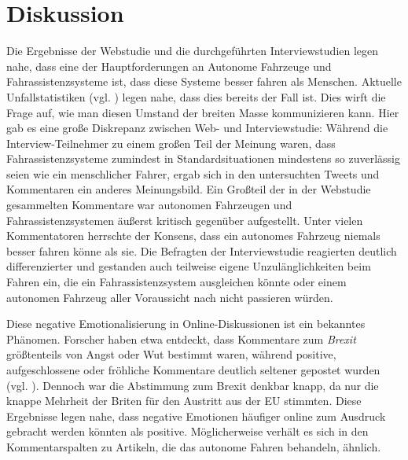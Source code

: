 \section{Diskussion}

Die Ergebnisse der Webstudie und die durchgeführten Interviewstudien legen nahe, dass eine der Hauptforderungen an Autonome Fahrzeuge und Fahrassistenzsysteme ist, dass diese Systeme besser fahren als Menschen. Aktuelle Unfallstatistiken (vgl. \cite{singh2015critical}) legen nahe, dass dies bereits der Fall ist. Dies wirft die Frage auf, wie man diesen Umstand der breiten Masse kommunizieren kann. Hier gab es eine große Diskrepanz zwischen Web- und Interviewstudie: Während die Interview-Teilnehmer zu einem großen Teil der Meinung waren, dass Fahrassistenzsysteme zumindest in Standardsituationen mindestens so zuverlässig seien wie ein menschlicher Fahrer, ergab sich in den untersuchten Tweets und Kommentaren ein anderes Meinungsbild. Ein Großteil der in der Webstudie gesammelten Kommentare war autonomen Fahrzeugen und Fahrassistenzsystemen äußerst kritisch gegenüber aufgestellt. Unter vielen Kommentatoren herrschte der Konsens, dass ein autonomes Fahrzeug niemals besser fahren könne als sie. Die Befragten der Interviewstudie reagierten deutlich differenzierter und gestanden auch teilweise eigene Unzulänglichkeiten beim Fahren ein, die ein Fahrassistenzsystem ausgleichen könnte oder einem autonomen Fahrzeug aller Voraussicht nach nicht passieren würden.

Diese negative Emotionalisierung in Online-Diskussionen ist ein bekanntes Phänomen. Forscher haben etwa entdeckt, dass Kommentare zum \emph{Brexit} größtenteils von Angst oder Wut bestimmt waren, während positive, aufgeschlossene oder fröhliche Kommentare deutlich seltener gepostet wurden (vgl. \cite[4]{bossetta2018shouting}). Dennoch war die Abstimmung zum Brexit denkbar knapp, da nur die knappe Mehrheit der Briten für den Austritt aus der EU stimmten. Diese Ergebnisse legen nahe, dass negative Emotionen häufiger online zum Ausdruck gebracht werden könnten als positive. Möglicherweise verhält es sich in den Kommentarspalten zu Artikeln, die das autonome Fahren behandeln, ähnlich.